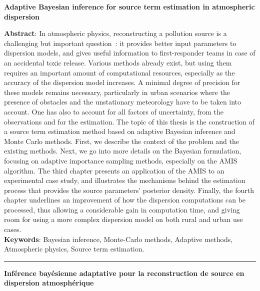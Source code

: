 \afterpage{\blankpage}

\thispagestyle{plain}

\begin{flushright}
\textbf{{ Adaptive Bayesian inference for source term estimation in atmospheric dispersion}}
\end{flushright}
{\small \textbf{Abstract}: In atmospheric physics, reconstructing a pollution source is a challenging but important question : it provides better input parameters to dispersion models, and gives useful information to first-responder teams in case of an accidental toxic release.
Various methods already exist, but using them requires an important amount of computational resources, especially as the accuracy of the dispersion model increases. A minimal degree of precision for these models remains necessary, particularly in urban scenarios where the presence of obstacles and the unstationary meteorology have to be taken into account. One has also to account for all factors of uncertainty, from the observations and for the estimation. 
The topic of this thesis is the construction of a source term estimation method based on adaptive Bayesian inference and Monte Carlo methods. First, we describe the context of the problem and the existing methods. Next, we go into more details on the Bayesian formulation, focusing on adaptive importance sampling methods, especially on the AMIS algorithm. The third chapter presents an application of the AMIS to an experimental case study, and illustrates the mechanisms behind the estimation process that provides the source parameters’ posterior density. Finally, the fourth chapter underlines an improvement of how the dispersion computations can be processed, thus allowing a considerable gain in computation time, and giving room for using a more complex dispersion model on both rural and urban use cases. \\

\textbf{Keywords}: Bayesian inference, Monte-Carlo methods, Adaptive methods, Atmospheric physics, Source term estimation.

}
\rule{\linewidth}{.5pt}
\begin{flushright}
	\textbf{{Inférence bayésienne adaptative pour la reconstruction de source en dispersion atmosphérique}}
\end{flushright}
